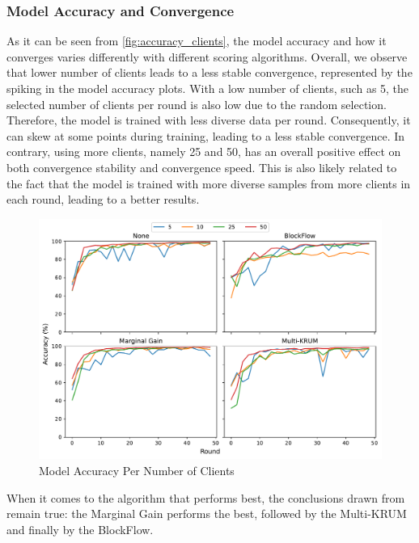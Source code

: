 \subsubsection{Model Accuracy and Convergence}

As it can be seen from \autoref{fig:accuracy_clients}, the model accuracy and how it converges varies differently with different scoring algorithms. Overall, we observe that lower number of clients leads to a less stable convergence, represented by the spiking in the model accuracy plots. With a low number of clients, such as 5, the selected number of clients per round is also low due to the random selection. Therefore, the model is trained with less diverse data per round. Consequently, it can skew at some points during training, leading to a less stable convergence. In contrary, using more clients, namely 25 and 50, has an overall positive effect on both convergence stability and convergence speed. This is also likely related to the fact that the model is trained with more diverse samples from more clients in each round, leading to a better results.

\begin{figure}[!ht]
    \centering
    \includegraphics[width=\textwidth]{graphics/clients/accuracy.pdf}
    \caption{Model Accuracy Per Number of Clients}
    \label{fig:accuracy_clients}
\end{figure}

When it comes to the algorithm that performs best, the conclusions drawn from  remain true: the Marginal Gain performs the best, followed by the Multi-KRUM and finally by the BlockFlow.

